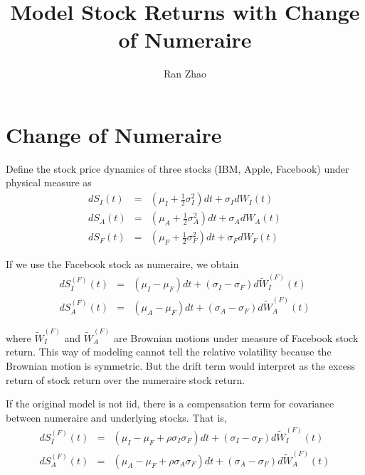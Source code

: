 \documentclass[11pt,reqno,final]{amsart}
\title{Model Stock Returns with Change of Numeraire}
\author{Ran Zhao}
\begin{document}
\begin{abstract}

\end{abstract}


\maketitle
%
%
%
\section{Change of Numeraire}
Define the stock price dynamics of three stocks (IBM, Apple, Facebook) under physical measure as
\begin{eqnarray*}
dS_I(t) &=& (\mu_I + \frac{1}{2}\sigma_I^2) dt + \sigma_I dW_I(t) \\
dS_A(t) &=& (\mu_A + \frac{1}{2}\sigma_A^2) dt + \sigma_A dW_A(t) \\
dS_F(t) &=& (\mu_F + \frac{1}{2}\sigma_F^2) dt + \sigma_F dW_F(t)
\end{eqnarray*}

If we use the Facebook stock as numeraire, we obtain
\begin{eqnarray*}
dS_I^{(F)}(t) &=& (\mu_I - \mu_F) dt + (\sigma_I - \sigma_F) d\tilde{W}^{(F)}_I(t) \\
dS_A^{(F)}(t) &=& (\mu_A - \mu_F) dt + (\sigma_A - \sigma_F) d\tilde{W}^{(F)}_A(t)
\end{eqnarray*}

where $\tilde{W}^{(F)}_I$ and $\tilde{W}^{(F)}_A$ are Brownian motions under measure of Facebook stock return. This way of modeling cannot tell the relative volatility because the Brownian motion is symmetric. But the drift term would interpret as the excess return of stock return over the numeraire stock return. 

If the original model is not iid, there is a compensation term for covariance between numeraire and underlying stocks. That is,
\begin{eqnarray*}
dS_I^{(F)}(t) &=& (\mu_I - \mu_F + \rho \sigma_I \sigma_F) dt + (\sigma_I - \sigma_F) d\tilde{W}^{(F)}_I(t) \\
dS_A^{(F)}(t) &=& (\mu_A - \mu_F + \rho \sigma_A \sigma_F) dt + (\sigma_A - \sigma_F) d\tilde{W}^{(F)}_A(t)
\end{eqnarray*}
\end{document}
